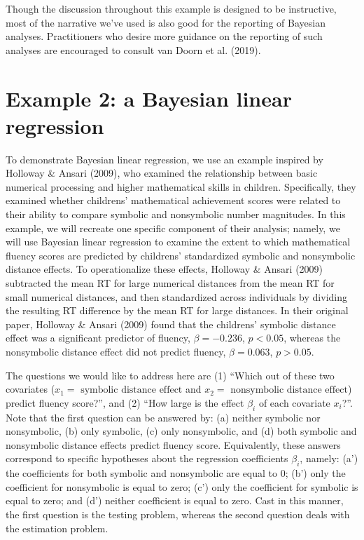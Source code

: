 \documentclass[english,,doc,floatsintext]{apa6}
\begin{document}
Though the discussion throughout this example is designed to be instructive, most of the narrative we've used is also good for the reporting of Bayesian analyses. Practitioners who desire more guidance on the reporting of such analyses are encouraged to consult van Doorn et al. (2019).

\hypertarget{example-2-a-bayesian-linear-regression}{%
\section{Example 2: a Bayesian linear regression}\label{example-2-a-bayesian-linear-regression}}

To demonstrate Bayesian linear regression, we use an example inspired by Holloway \& Ansari (2009), who examined the relationship between basic numerical processing and higher mathematical skills in children. Specifically, they examined whether childrens' mathematical achievement scores were related to their ability to compare symbolic and nonsymbolic number magnitudes. In this example, we will recreate one specific component of their analysis; namely, we will use Bayesian linear regression to examine the extent to which mathematical fluency scores are predicted by childrens' standardized symbolic and nonsymbolic distance effects. To operationalize these effects, Holloway \& Ansari (2009) subtracted the mean RT for large numerical distances from the mean RT for small numerical distances, and then standardized across individuals by dividing the resulting RT difference by the mean RT for large distances.
In their original paper, Holloway \& Ansari (2009) found that the childrens' symbolic distance effect was a significant predictor of fluency, \(\beta = -0.236\), \(p<0.05\), whereas the nonsymbolic distance effect did not predict fluency, \(\beta=0.063\), \(p > 0.05\).

The questions we would like to address here are (1) \enquote{Which out of these two covariates (\(x_{1}=\text{ symbolic distance effect}\) and \(x_{2}=\text{ nonsymbolic distance effect}\)) predict fluency score?}, and (2) \enquote{How large is the effect \(\beta_{i}\) of each covariate \(x_{i}\)?}. Note that the first question can be answered by: (a) neither symbolic nor nonsymbolic, (b) only symbolic, (c) only nonsymbolic, and (d) both symbolic and nonsymbolic distance effects predict fluency score. Equivalently, these answers correspond to specific hypotheses about the regression coefficients \(\beta_{i}\), namely: (a') the coefficients for both symbolic and nonsymbolic are equal to 0; (b') only the coefficient for nonsymbolic is equal to zero; (c') only the coefficient for symbolic is equal to zero; and (d') neither coefficient is equal to zero. Cast in this manner, the first question is the testing problem, whereas the second question deals with the estimation problem.
\end{document}
